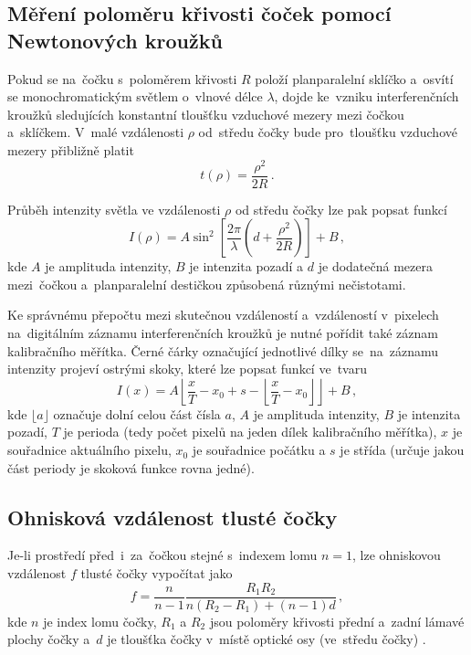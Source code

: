 \documentclass{../concepts/titul_protokol_p/prepareprotokol} %
\begin{document}
\subsection{Měření poloměru křivosti čoček pomocí Newtonových kroužků}

Pokud se na~čočku s~poloměrem křivosti $R$ položí planparalelní sklíčko a~osvítí se monochromatickým
světlem o~vlnové délce $\lambda$, dojde ke~vzniku interferenčních kroužků sledujících konstantní tloušťku
vzduchové mezery mezi čočkou a~sklíčkem. V~malé vzdálenosti $\rho$ od~středu čočky bude pro~tloušťku
vzduchové mezery přibližně platit \cite{newton}
\begin{equation}
    \label{eq:tloustkanarho}
    t(\rho) = \frac{\rho^2}{2 R} \,.
\end{equation}

Průběh intenzity světla ve vzdálenosti $\rho$ od středu čočky lze pak popsat funkcí \cite{newton}
\begin{equation}
    \label{eq:intenzita}
    I(\rho) = A \sin^2 \left[ \frac{2 \pi}{\lambda} \left( d + \frac{\rho^2}{2 R}\right)\right] + B \,,
\end{equation}
kde $A$ je amplituda intenzity, $B$ je intenzita pozadí a $d$ je dodatečná mezera mezi~čočkou
a~planparalelní destičkou způsobená různými nečistotami.

Ke správnému přepočtu mezi skutečnou vzdáleností a~vzdáleností v~pixelech na~digitálním záznamu
interferenčních kroužků je nutné pořídit také záznam kalibračního měřítka. Černé čárky označující
jednotlivé dílky se~na~záznamu intenzity projeví ostrými skoky, které lze popsat funkcí ve~tvaru \cite{newton}
\begin{equation}
    \label{eq:meritko}
    I(x) = A \left\lfloor \frac{x}{T} - x_0 + s - \left\lfloor \frac{x}{T} - x_0 \right\rfloor \right\rfloor + B \,,
\end{equation}
kde $\lfloor a \rfloor$ označuje dolní celou část čísla $a$, $A$ je amplituda intenzity, $B$ je intenzita pozadí,
$T$ je perioda (tedy počet pixelů na jeden dílek kalibračního měřítka), $x$ je souřadnice aktuálního pixelu,
$x_0$ je souřadnice počátku a $s$ je střída
(určuje jakou část periody je skoková funkce rovna jedné).


\subsection{Ohnisková vzdálenost tlusté čočky}

Je-li prostředí před~i~za~čočkou stejné s~indexem lomu $n=1$, lze ohniskovou vzdálenost 
$f$ tlusté čočky vypočítat jako
\begin{equation}
    \label{eq:ohniskovavzdalenost}
    f = \frac{n}{n-1} \frac{R_1 R_2}{n (R_2 - R_1) + (n-1) d} \,,
\end{equation}
kde $n$ je index lomu čočky, $R_1$ a $R_2$ jsou poloměry křivosti přední a~zadní lámavé plochy čočky
a~$d$ je tloušťka čočky v~místě optické osy (ve~středu čočky) \cite{wiki}.
\end{document}
